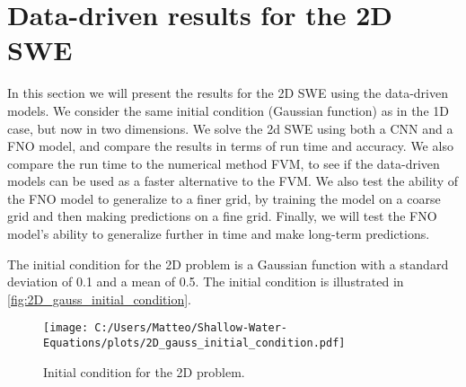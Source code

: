 \section{Data-driven results for the 2D SWE}\label{sec:data-driven-results-2D}
In this section we will present the results for the 2D SWE using the data-driven models.
We consider the same initial condition (Gaussian function) as in the 1D case, but now in two dimensions.
We solve the 2d SWE using both a CNN and a FNO model, and compare the results in terms of run time and accuracy.
We also compare the run time to the numerical method FVM, to see if the data-driven models can be used as a faster alternative to the FVM.
We also test the ability of the FNO model to generalize to a finer grid, by training the model on a coarse grid and then making predictions on a fine grid.
Finally, we will test the FNO model's ability to generalize further in time and make long-term predictions.

The initial condition for the 2D problem is a Gaussian function with a standard deviation of 0.1 and a mean of 0.5.
The initial condition is illustrated in \autoref{fig:2D_gauss_initial_condition}.
\begin{figure}[H]
    \centering
    \texttt{[image: C:/Users/Matteo/Shallow-Water-Equations/plots/2D\_gauss\_initial\_condition.pdf]}
    \caption{Initial condition for the 2D problem.}
\end{figure}


